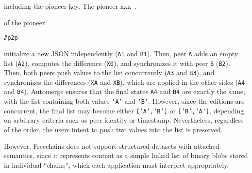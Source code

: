 \documentclass[12pt]{article}
\newcommand{\code}[1]  {\texttt{\footnotesize{#1}}}
\begin{document}
 including the pioneer key.
The pioneer xxx~\cite{TODO}.

 of the pioneer



\code{#p2p}



initialize a new JSON independently (\code{A1} and
\code{B1}).
Then, peer \code{A} adds an empty list (\code{A2}), computes the difference
(\code{X0}), and synchronizes it with peer \code{B} (\code{B2}).
Then, both peers push values to the list concurrently (\code{A3} and
\code{B3}), and synchronizes the differences (\code{XA} and \code{XB}), which
are applied in the other sides (\code{A4} and \code{B4}).
Automerge ensures that the final states \code{A4} and \code{B4} are exactly the
same, with the list containing both values \code{'A'} and \code{'B'}.
However, since the editions are concurrent, the final list may become either
\code{['A','B']} or \code{['B','A']}, depending on arbitrary criteria such as
peer identity or timestamp.
Nevertheless, regardless of the order, the users intent to push two values into
the list is preserved.

However, Freechains does not support structured datasets with attached semantics, since
it represents content as a simple linked list of binary blobs stored in individual “chains”,
which each application must interpret appropriately.

%
%
\end{document}
